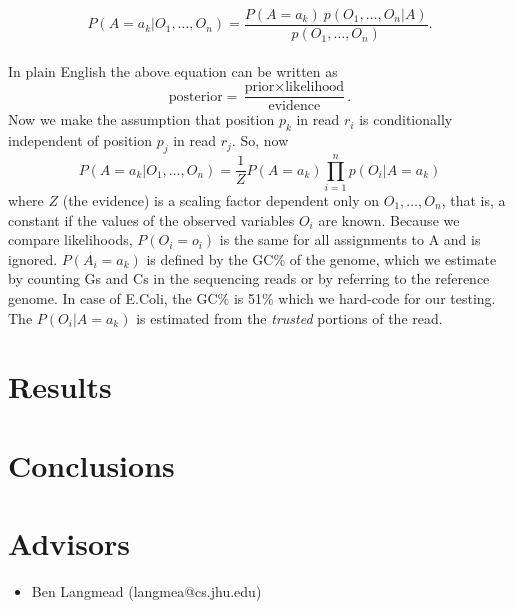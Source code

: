\documentclass[11pt]{article}
\begin{document}
\begin{displaymath} P(A = a_k \vert O_1,\dots,O_n) = \frac{P(A=a_k) \ p(O_1,\dots,O_n\vert A)}{p(O_1,\dots,O_n)}. \end{displaymath}\\
In plain English the above equation can be written as
\begin{displaymath}
  \mbox{posterior} = \frac{\mbox{prior} \times \mbox{likelihood}}{\mbox{evidence}}.
\end{displaymath}
Now we make the assumption that position $p_k$ in read $r_i$ is conditionally independent of position $p_j$ in read $r_j$. So, now
\begin{displaymath} P(A = a_k\vert O_1,\dots,O_n) = \frac{1}{Z}  P(A = a_k) \prod_{i=1}^n p(O_i \vert A = a_k) \end{displaymath}
where $Z$ (the evidence) is a scaling factor dependent only on $O_1,\dots,O_n$, that is, a constant if the values of the observed variables $O_i$ are known. Because we compare likelihoods, $P(O_i = o_i)$ is the same for all assignments to A and is ignored. $P(A_i = a_k)$ is defined by the GC\% of the genome, which we estimate by counting Gs and Cs in the sequencing reads or by referring to the reference genome. In case of E.Coli, the GC\% is 51\% which we hard-code for our testing. The $P(O_i \vert A = a_k)$ is estimated from the \textit{trusted} portions of the read.
\section{Results}

\section{Conclusions}

\section{Advisors}
\begin{itemize}
	\item Ben Langmead (langmea@cs.jhu.edu)
\end{itemize}


\nocite{*}


\end{document}
